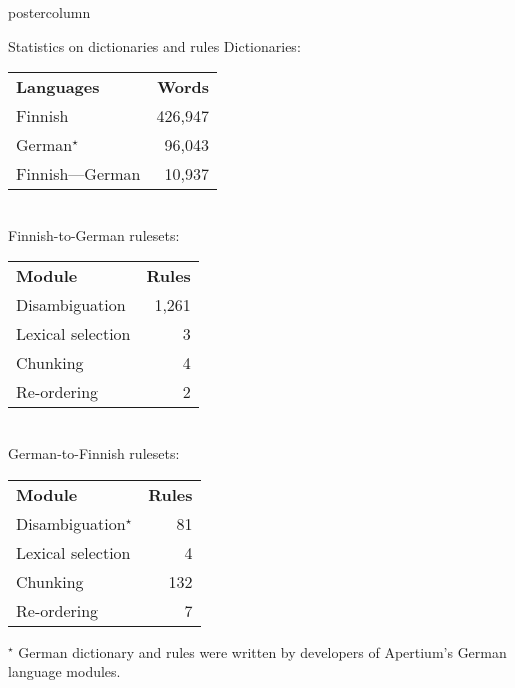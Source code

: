 \documentclass[final,hyperref={pdfpagelabels}]{beamer}
\begin{document}
\begin{frame}
\begin{columns}
\begin{column}{.49\textwidth}
\begin{beamercolorbox}[center,wd=\textwidth]{postercolumn}
\begin{minipage}[T]{.95\textwidth}
{        \begin{block}{Statistics on dictionaries and rules}
            Dictionaries:
            \begin{tabular}{|l|r|}
                \hline
                \bf Languages & \bf Words \\
                Finnish & 426,947 \\
                German$^\star$ & 96,043\\
                Finnish---German & 10,937 \\
                \hline
            \end{tabular}
            \\
            Finnish-to-German rulesets:
            \begin{tabular}{|l|r|}
                \hline
                \bf Module & \bf Rules \\
                Disambiguation & 1,261 \\
                Lexical selection & 3 \\
                Chunking & 4 \\
                Re-ordering & 2\\
                \hline
            \end{tabular}
            \\
            German-to-Finnish rulesets:
            \begin{tabular}{|l|r|}
                \hline
                \bf Module & \bf Rules \\
                Disambiguation$^\star$ & 81 \\
                Lexical selection & 4 \\
                Chunking & 132 \\
                Re-ordering & 7 \\
                \hline
            \end{tabular}
            $^\star$ German dictionary and rules were written by developers
            of Apertium's German language modules.
        \end{block}


}
\end{minipage}
\end{beamercolorbox}
\end{column}
\end{columns}
\end{frame}
\end{document}
